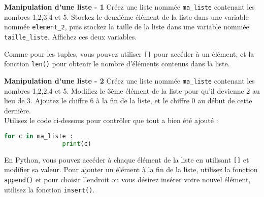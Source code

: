      \begin{Exercice}[5 minutes] \textbf{Manipulation d'une liste - 1}
        Créez une liste nommée \lstinline{ma_liste} contenant les nombres 1,2,3,4 et 5. Stockez le deuxième élément de la liste dans une variable nommée \lstinline{element_2}, puis stockez la taille de la liste dans une variable nommée \lstinline{taille_liste}. Affichez ces deux variables.\\
    
        \begin{conseil}
            Comme pour les tuples, vous pouvez utiliser \lstinline{[]} pour accéder à un élément, et la fonction \lstinline{len()} pour obtenir le nombre d'éléments contenus dans la liste.
        \end{conseil}
        
        \begin{solution}
             
        \end{solution}
    \end{Exercice}
    
    \begin{Exercice}[5 minutes] \textbf{Manipulation d'une liste - 2}
       Créez une liste nommée \lstinline{ma_liste} contenant les nombres 1,2,2,4 et 5. Modifiez le 3ème élément de la liste pour qu'il devienne 2 au lieu de 3. Ajoutez le chiffre 6 à la fin de la liste, et le chiffre 0 au début de cette dernière. \\
       
       Utilisez le code ci-dessous pour contrôler que tout a bien été ajouté : \\
       
       \begin{lstlisting}[language=Python]
            for c in ma_liste :
            	print(c)   \end{lstlisting}
    
        \begin{conseil}
            En Python, vous pouvez accéder à chaque élément de la liste en utilisant \lstinline{[]} et modifier sa valeur. Pour ajouter un élément à la fin de la liste, utilisez la fonction \lstinline{append()} et pour choisir l'endroit ou vous désirez insérer votre nouvel élément, utilisez la fonction \lstinline{insert()}.
        \end{conseil}
        
        \begin{solution}
             
        \end{solution}
    \end{Exercice}
    
